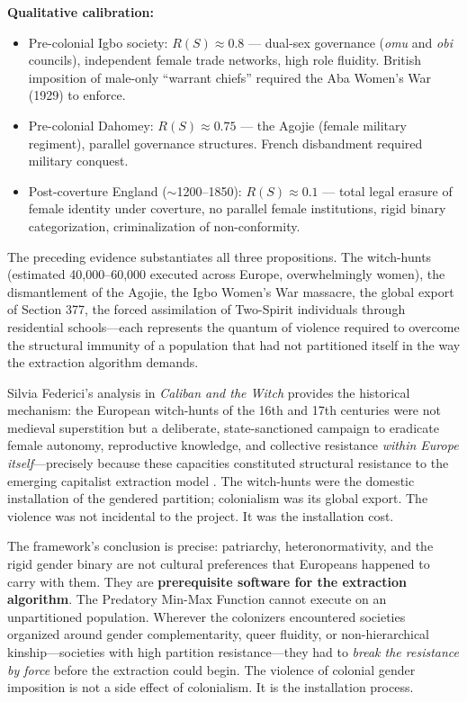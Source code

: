 \documentclass[12pt,openany]{book}
\begin{document}
\begin{definition}
\medskip
\textbf{Qualitative calibration:}
\begin{itemize}[leftmargin=*]
    \item Pre-colonial Igbo society: $R(S) \approx 0.8$ --- dual-sex governance (\textit{omu} and \textit{obi} councils), independent female trade networks, high role fluidity. British imposition of male-only ``warrant chiefs'' required the Aba Women's War (1929) to enforce.
    \item Pre-colonial Dahomey: $R(S) \approx 0.75$ --- the Agojie (female military regiment), parallel governance structures. French disbandment required military conquest.
    \item Post-coverture England ($\sim$1200--1850): $R(S) \approx 0.1$ --- total legal erasure of female identity under coverture, no parallel female institutions, rigid binary categorization, criminalization of non-conformity.
\end{itemize}
\end{definition}

The preceding evidence substantiates all three propositions. The witch-hunts (estimated 40,000--60,000 executed across Europe, overwhelmingly women), the dismantlement of the Agojie, the Igbo Women's War massacre, the global export of Section 377, the forced assimilation of Two-Spirit individuals through residential schools---each represents the quantum of violence required to overcome the structural immunity of a population that had not partitioned itself in the way the extraction algorithm demands.

Silvia Federici's analysis in \textit{Caliban and the Witch} provides the historical mechanism: the European witch-hunts of the 16th and 17th centuries were not medieval superstition but a deliberate, state-sanctioned campaign to eradicate female autonomy, reproductive knowledge, and collective resistance \textit{within Europe itself}---precisely because these capacities constituted structural resistance to the emerging capitalist extraction model \cite{federici}. The witch-hunts were the domestic installation of the gendered partition; colonialism was its global export. The violence was not incidental to the project. It was the installation cost.

The framework's conclusion is precise: patriarchy, heteronormativity, and the rigid gender binary are not cultural preferences that Europeans happened to carry with them. They are \textbf{prerequisite software for the extraction algorithm}. The Predatory Min-Max Function cannot execute on an unpartitioned population. Wherever the colonizers encountered societies organized around gender complementarity, queer fluidity, or non-hierarchical kinship---societies with high partition resistance---they had to \textit{break the resistance by force} before the extraction could begin. The violence of colonial gender imposition is not a side effect of colonialism. It is the installation process.
\end{document}
